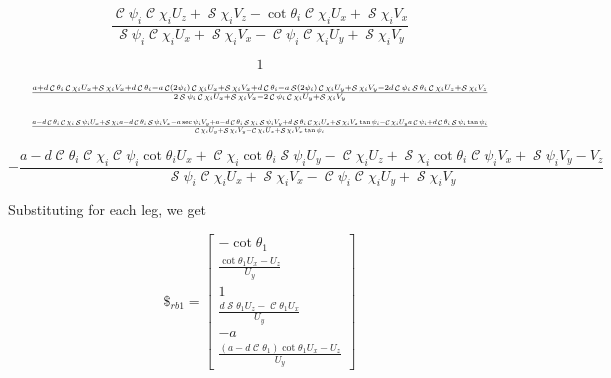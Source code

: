 \documentclass[titlepage, letterpaper]{article}
\DeclareMathOperator{\cose}{\mathcal{C}}
\DeclareMathOperator{\sen}{\mathcal{S}}
\begin{document}
\begin{equation}
    \label{eq:constraint-screw2}
    \frac{\cose \psi _i \cose \chi _i U_z+\sen \chi _i V_z-\cot \theta _i \cose \chi _i U_x+\sen \chi _i V_x}{\sen \psi _i \cose \chi _i U_x+\sen \chi _i V_x-\cose \psi _i \cose \chi _i U_y+\sen \chi _i V_y}
\end{equation}

\begin{equation}
    \label{eq:constraint-screw3}
    1
\end{equation}

\begin{equation}
    \label{eq:constraint-screw4}
    \resizebox{0.95\hsize}{!}{%
        $\frac{a+d \cose \theta _i \cose \chi _i U_x+\sen \chi _i V_x+d \cose \theta _i-a \cose (2 \psi _i) \cose \chi _i U_x+\sen \chi _i V_x+d \cose \theta _i-a \sen (2 \psi _i) \cose \chi _i U_y+\sen \chi _i V_y-2 d \cose \psi _i \sen \theta _i \cose \chi _i U_z+\sen \chi _i V_z}{2 \sen \psi _i \cose \chi _i U_x+\sen \chi _i V_x-2 \cose \psi _i \cose \chi _i U_y+\sen \chi _i V_y}$%
    }
\end{equation}

\begin{equation}
    \label{eq:constraint-screw5}
    \resizebox{0.95\hsize}{!}{%
    $\frac{a-d \cose \theta _i \cose \chi _i \sen \psi _i U_x+\sen \chi _i a-d \cose \theta _i \sen \psi _i V_x-a \sec \psi _i V_y+a-d \cose \theta _i \sen \chi _i \sen \psi _i V_y+d \sen \theta _i \cose \chi _i U_z+\sen \chi _i V_z \tan \psi _i-\cose \chi _i U_y a \cose \psi _i+d \cose \theta _i \sen \psi _i \tan \psi _i}{\cose \chi _i U_y+\sen \chi _i V_y-\cose \chi _i U_x+\sen \chi _i V_x \tan \psi _i}$%
    }
\end{equation}

\begin{equation}
    \label{eq:constraint-screw6}
    -\frac{a-d \cose \theta _i \cose \chi _i \cose \psi _i \cot \theta _i U_x+\cose \chi _i \cot \theta _i \sen \psi _i U_y-\cose \chi _i U_z+\sen \chi _i \cot \theta _i \cose \psi _i V_x+\sen \psi _i V_y-V_z}{\sen \psi _i \cose \chi _i U_x+\sen \chi _i V_x-\cose \psi _i \cose \chi _i U_y+\sen \chi _i V_y}
\end{equation}

Substituting for each leg, we get

\begin{equation}
    \label{eq:rb1}
    \$_{rb1} =
    \begin{bmatrix}
     -\cot\theta _1 \\
     \frac{\cot\theta _1 U_x-U_z}{U_y} \\
     1 \\
     \frac{d\sen\theta _1 U_z-\cose\theta _1 U_x}{U_y} \\
     -a \\
     \frac{(a-d \cose\theta _1)\cot\theta _1 U_x-U_z}{U_y}
    \end{bmatrix}
\end{equation}
\end{document}
